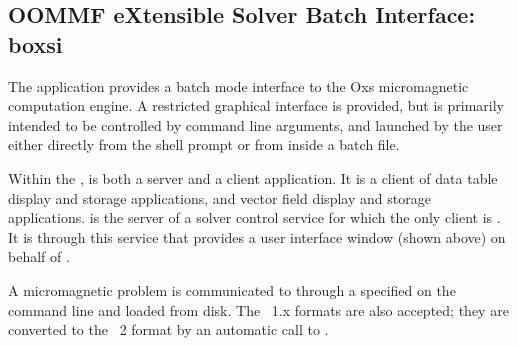 

\subsection{OOMMF eXtensible Solver Batch Interface: boxsi}\label{sec:boxsi}%

\begin{center}
\end{center}

The application  provides a batch mode interface to the Oxs
micromagnetic computation engine.  A restricted graphical interface is
provided, but  is primarily intended to be controlled by
command line arguments, and launched by the user either directly from
the shell prompt or from inside a batch file.

Within the ,  is both a server and a client
application. It is a client of data table display and storage
applications, and vector field display and storage applications.
 is the server of a solver control service for which the only
client is .  It is through
this service that  provides a user interface window (shown
above) on behalf of .

A micromagnetic problem is communicated to  through a
 specified on the command line
and loaded from disk.  The \MIF~1.x formats are also accepted; they are
converted to the \MIF~2 format by an automatic call to
.

